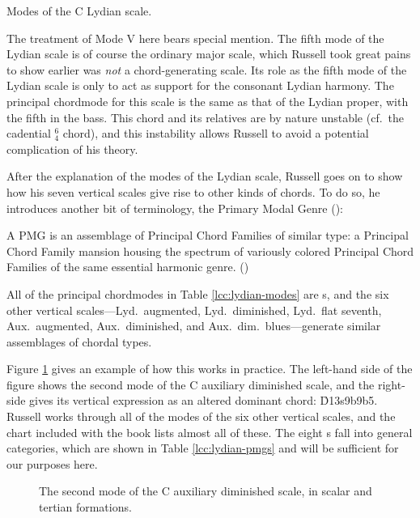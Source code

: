 \begin{table}[tbp]
  \caption{Modes of the C Lydian scale.}
  \label{lcc:lydian-modes}
\end{table}

The treatment of Mode V here bears special mention. The fifth mode of the
Lydian scale is of course the ordinary major scale, which Russell took great
pains to show earlier was \emph{not} a chord-generating scale. Its
role as the fifth mode of the Lydian scale is only to act as support for the
consonant Lydian harmony. The principal chordmode for this scale is the same
as that of the Lydian proper, with the fifth in the bass. This chord and its
relatives are by nature unstable (cf.\ the cadential $^6_4$ chord), and this
instability allows Russell to avoid a potential complication of his theory.

After the explanation of the modes of the Lydian scale, Russell goes on to show
how his seven vertical scales give rise to other kinds of chords. To do so,
he introduces another bit of terminology, the Primary Modal Genre
():%
%
\begin{quoting}
  \singlespacing
  A PMG is an assemblage of Principal Chord Families of similar type: a
  Principal Chord Family mansion housing the spectrum of variously colored
  Principal Chord Families of the same essential harmonic
  genre. ()
\end{quoting}
%
\noindent All of the principal chordmodes in Table \ref{lcc:lydian-modes} are
s, and the six other vertical scales---Lyd.\ augmented, Lyd.\
diminished, Lyd.\ flat seventh, Aux.\ augmented, Aux.\ diminished, and Aux.\
dim.\ blues---generate similar assemblages of chordal types.

Figure \ref{lcc:alternate-pmg} gives an example of how this works in practice.
The left-hand side of the figure shows the second mode of the C auxiliary
diminished scale, and the right-side gives its vertical expression as an
altered dominant chord: \h{D13s9b9b5}. Russell works through all of the modes
of the six other vertical scales, and the chart included with the book lists
almost all of these. The eight \abbrev{PMG}s fall into general categories,
which are shown in Table \ref{lcc:lydian-pmgs} and will be sufficient for our
purposes here.\fn{lcc-20}

\begin{figure}[tb]
  \caption{The second mode of the C auxiliary diminished scale, in scalar and
    tertian formations.}
  \label{lcc:alternate-pmg}
\end{figure}


